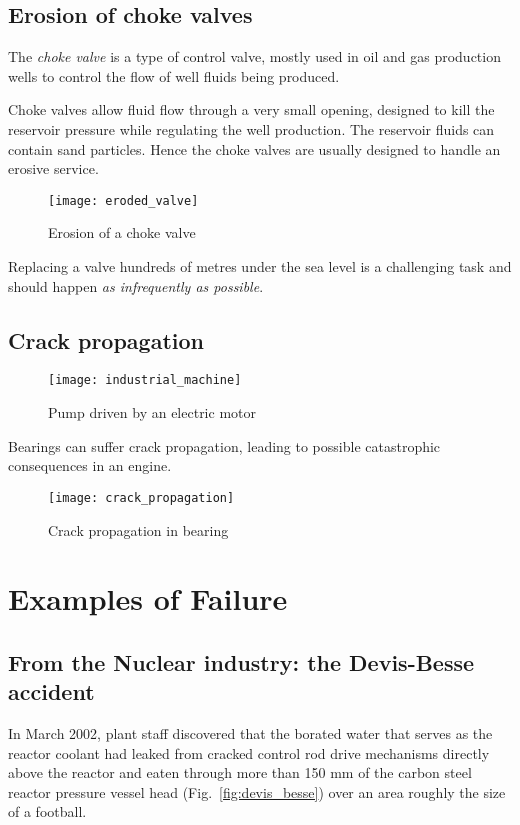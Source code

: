\subsection{Erosion of choke valves}
The \emph{choke valve} is a type of control valve, mostly used in oil and gas
production wells to control the flow of well fluids being produced.

Choke valves allow fluid flow through a very small opening, designed to kill the
reservoir pressure while regulating the well production. The reservoir fluids
can contain sand particles. Hence the choke valves are usually designed to
handle an erosive service.

\begin{figure}[!htp]
    \centering
    \texttt{[image: eroded\_valve]}
    \caption{Erosion of a choke valve}
\end{figure}

Replacing a valve hundreds of metres under the sea level is a challenging task
and should happen \emph{as infrequently as possible}.

\subsection{Crack propagation}
\begin{figure}[!htp]
    \centering
    \texttt{[image: industrial\_machine]}
    \caption{Pump driven by an electric motor}
\end{figure}

Bearings can suffer crack propagation, leading to possible catastrophic
consequences in an engine.

\begin{figure}[!htp]
    \centering
    \texttt{[image: crack\_propagation]}
    \caption{Crack propagation in bearing}
\end{figure}

\section{Examples of Failure}
\subsection{From the Nuclear industry: the Devis-Besse accident}

In March 2002, plant staff discovered that the borated water that serves as the
reactor coolant had leaked from cracked control rod drive mechanisms directly
above the reactor and eaten through more than 150 mm of the carbon steel reactor
pressure vessel head (Fig.~\ref{fig:devis_besse}) over an area roughly the
size of a football.

